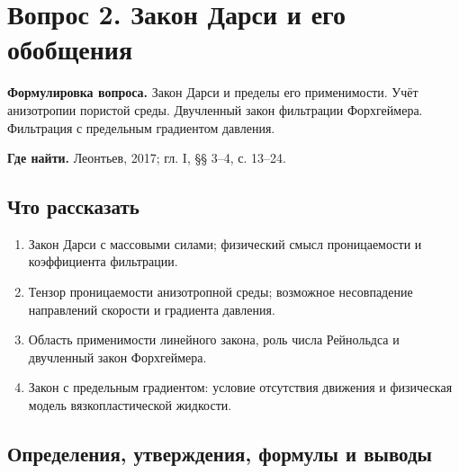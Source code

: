 \documentclass[12pt,a4paper]{article}
\newcounter{questionnumber}
\begin{document}
\clearpage
\setcounter{questionnumber}{2}
\setcounter{equation}{0}
\setcounter{footnote}{0}
\section*{Вопрос 2. Закон Дарси и его обобщения}
\textbf{Формулировка вопроса.} Закон Дарси и пределы его применимости. Учёт анизотропии пористой среды. Двучленный закон фильтрации Форхгеймера. Фильтрация с предельным градиентом давления.

\medskip
\textbf{Где найти.} Леонтьев, 2017; гл. I, §§ 3--4, с. 13--24.

\subsection*{Что рассказать}
\begin{enumerate}
\item Закон Дарси с массовыми силами; физический смысл проницаемости и коэффициента фильтрации.
\item Тензор проницаемости анизотропной среды; возможное несовпадение направлений скорости и градиента давления.
\item Область применимости линейного закона, роль числа Рейнольдса и двучленный закон Форхгеймера.
\item Закон с предельным градиентом: условие отсутствия движения и физическая модель вязкопластической жидкости.
\end{enumerate}
\subsection*{Определения, утверждения, формулы и выводы}
\begingroup
\newcommand{\source}[2]{\par\nobreak\smallskip{\small Н. Е. Леонтьев. \textit{Основы теории фильтрации}. 2-е изд., 2017. Глава I, §~#1, с.~#2.}\par\medskip}
\end{document}

